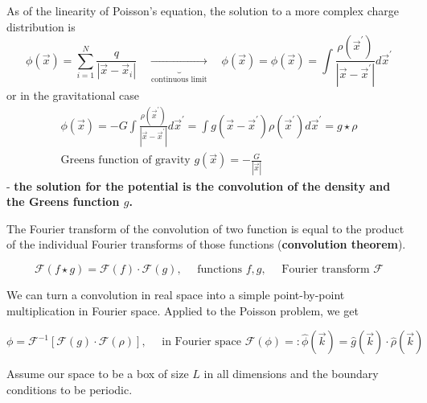 As of the linearity of Poisson's equation, the solution to a more complex charge distribution is
\begin{equation}
    \phi(\vec{x})=\sum_{i=1}^N \frac{q}{\left|\vec{x}-\vec{x}_i\right|} \quad \underbrace{\rightarrow}_{\text{continuous limit}} \quad \phi(\vec{x}) = \phi(\vec{x})=\int \frac{\rho\left(\vec{x}^{\prime}\right)}{\left|\vec{x}-\vec{x}^{\prime}\right|} d \vec{x}^{\prime}
\end{equation}
or in the gravitational case
\begin{equation}
    \begin{gathered}
        \phi(\vec{x})=-G \int \frac{\rho\left(\vec{x}^{\prime}\right)}{\left|\vec{x}-\vec{x}^{\prime}\right|} d \vec{x}^{\prime}=\int g\left(\vec{x}-\vec{x}^{\prime}\right) \rho\left(\vec{x}^{\prime}\right) d \vec{x}^{\prime}=g \star \rho \\
        \text{Greens function of gravity } g(\vec{x}) = -\frac{G}{|\vec{x}|}
    \end{gathered}
\end{equation}
- \textbf{the solution for the potential is the convolution of the density and the Greens function $g$.}

The Fourier transform of the convolution of two function is equal to the product
of the individual Fourier transforms of those functions (\textbf{convolution theorem}).

\begin{equation}
    \mathcal{F}(f \star g)=\mathcal{F}(f) \cdot \mathcal{F}(g), \quad \text { functions } f, g, \quad \text { Fourier transform } \mathcal{F}
\end{equation}

We can turn a convolution in real space into a simple point-by-point multiplication in Fourier space. Applied
to the Poisson problem, we get

\begin{equation}
    \phi=\mathcal{F}^{-1}[\mathcal{F}(g) \cdot \mathcal{F}(\rho)], \quad \text { in Fourier space } \mathcal{F}(\phi)=: \hat{\phi}(\vec{k})=\hat{g}(\vec{k}) \cdot \hat{\rho}(\vec{k})
\end{equation}


Assume our space to be a box of size $L$ in all dimensions and the boundary conditions to be periodic.

